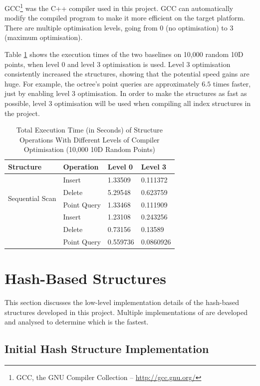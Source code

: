GCC\footnote{GCC, the GNU Compiler Collection -- \url{http://gcc.gnu.org/}} was the C++ compiler used in this project. GCC can automatically modify the compiled program to make it more efficient on the target platform. There are multiple optimisation levels, going from 0 (no optimisation) to 3 (maximum optimisation).

Table \ref{tab:compiler-optimisation} shows the execution times of the two baselines on 10,000 random 10D points, when level 0 and level 3 optimisation is used. Level 3 optimisation consistently increased the structures, showing that the potential speed gains are huge. For example, the octree's point queries are approximately $6.5$ times faster, just by enabling level 3 optimisation.  In order to make the structures as fast as possible, level 3 optimisation will be used when compiling all index structures in the project.

\begin{table}
	\centering
	\begin{tabular}{|l|l|l|l|}
		\hline
		\textbf{Structure} & \textbf{Operation} & \textbf{Level 0} & \textbf{Level 3} \\
		\hline
		\multirow{ 4}{*}{Sequential Scan} & Insert & 1.33509 & 0.111372 \\
		 & Delete & 5.29548 & 0.623759 \\
		 & Point Query & 1.33468 & 0.111909 \\
		\hline
		\multirow{ 4}{*}{Octree} & Insert & 1.23108 & 0.243256 \\
		 & Delete & 0.73156 & 0.13589 \\
		 & Point Query & 0.559736 & 0.0860926 \\
		 \hline
	\end{tabular}
	\caption{Total Execution Time (in Seconds) of Structure Operations With Different Levels of Compiler Optimisation (10,000 10D Random Points)}
	\label{tab:compiler-optimisation}
\end{table}

\section{Hash-Based Structures}
\label{sec:iteration1}

This section discusses the low-level implementation details of the hash-based structures developed in this project. Multiple implementations of are developed and analysed to determine which is the fastest.

\subsection{Initial Hash Structure Implementation}

